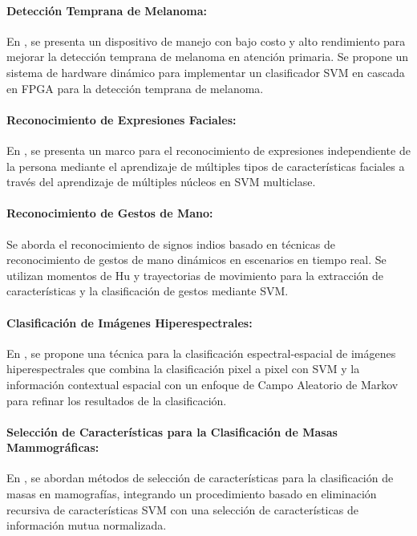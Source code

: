 \paragraph{Detección Temprana de Melanoma:} En \cite{svmm2}, se presenta un dispositivo de manejo con bajo costo y alto rendimiento para mejorar la detección temprana de melanoma en atención primaria. Se propone un sistema de hardware dinámico para implementar un clasificador SVM en cascada en FPGA para la detección temprana de melanoma.

\paragraph{Reconocimiento de Expresiones Faciales:} En \cite{svmm3}, se presenta un marco para el reconocimiento de expresiones independiente de la persona mediante el aprendizaje de múltiples tipos de características faciales a través del aprendizaje de múltiples núcleos en SVM multiclase.

\paragraph{Reconocimiento de Gestos de Mano:} Se aborda el reconocimiento de signos indios basado en técnicas de reconocimiento de gestos de mano dinámicos en escenarios en tiempo real. Se utilizan momentos de Hu y trayectorias de movimiento para la extracción de características y la clasificación de gestos mediante SVM.

\paragraph{Clasificación de Imágenes Hiperespectrales:} En \cite{svmm4}, se propone una técnica para la clasificación espectral-espacial de imágenes hiperespectrales que combina la clasificación pixel a pixel con SVM y la información contextual espacial con un enfoque de Campo Aleatorio de Markov para refinar los resultados de la clasificación.

\paragraph{Selección de Características para la Clasificación de Masas Mammográficas:} En \cite{svmm5}, se abordan métodos de selección de características para la clasificación de masas en mamografías, integrando un procedimiento basado en eliminación recursiva de características SVM con una selección de características de información mutua normalizada.

